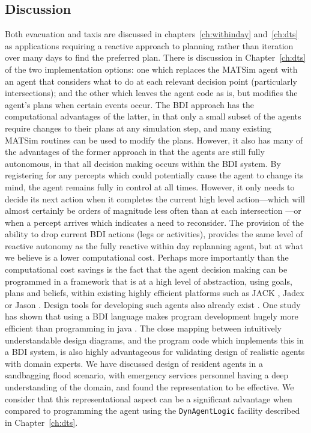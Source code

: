 \subsection{Discussion}
Both evacuation and taxis are discussed in chapters~\ref{ch:withinday} and~\ref{ch:dts} 
as applications requiring a reactive approach to planning
rather than iteration over many days to find the preferred plan. There
is discussion in Chapter~\ref{ch:dts} of the two implementation options: one
which replaces the MATSim agent with an agent that considers what to
do at each relevant decision point (particularly intersections); and
the other which leaves the agent code as is, but modifies the agent's
plans when certain events occur. The BDI approach has the computational
advantages of the latter, in that only a small subset of the agents
require changes to their plans at any simulation step, and many
existing MATSim routines can be used to modify the plans. However, it
also has many of the advantages of the former approach in that the
agents are still fully autonomous, in that all decision making occurs
within the BDI system. By registering for any percepts which could
potentially cause the agent to change its mind, the agent remains
fully in control at all times. However, it only needs to decide its next action
when it completes the current high level action---which will almost
certainly be orders of magnitude less often than at each intersection
---or when a percept arrives which indicates a need to reconsider. The
provision of the ability to drop current BDI actions (legs or
activities), provides the same level of reactive autonomy as the fully
reactive within day replanning agent, but at what we believe is a
lower computational cost. 
%
Perhaps more importantly than the computational cost savings is the
fact that the agent decision making can be programmed in a framework
that is at a high level of abstraction, using goals, plans and
beliefs, within existing highly efficient platforms such as JACK
\cite{jackref}, Jadex \cite{jadex2005} or Jason \cite{jason}. Design
tools for developing such agents also already exist
\cite{prometheusbook}. One study has shown that using a BDI language
makes program development hugely more efficient than programming in
java \cite{benfield}. The close mapping between intuitively
understandable design diagrams, and the program code which implements
this in a BDI system, is also highly advantageous for validating
design of realistic agents with domain experts. We have discussed
design of resident agents in a sandbagging flood scenario, with
emergency services personnel having a deep understanding of the
domain, and found the representation to be effective. We consider that
this representational aspect can be a significant advantage when
compared to programming the agent using the \texttt{DynAgentLogic}
facility described in Chapter~\ref{ch:dts}.









